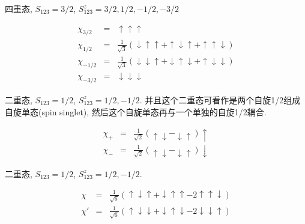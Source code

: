 四重态, $S_{123}=3/2$, $S_{123}^z = 3/2, 1/2, -1/2, -3/2$

\begin{eqnarray*}
\chi_{3/2} &=& \uparrow \uparrow \uparrow \\
\chi_{1/2} &=& \frac{1} {{\sqrt 3 }}\left( { \downarrow  \uparrow
\uparrow  +  \uparrow  \downarrow  \uparrow  +  \uparrow  \uparrow
\downarrow } \right) \\
\chi _{ - 1/2} &=& \frac{1} {{\sqrt 3 }}\left( { \downarrow
\downarrow  \uparrow  +  \downarrow  \uparrow  \downarrow  +
\uparrow  \downarrow  \downarrow } \right) \\
\chi _{ - 3/2} &=& \downarrow  \downarrow  \downarrow
\end{eqnarray*}



二重态, $S_{123}=1/2$, $S_{123}^z = 1/2, -1/2$.
并且这个二重态可看作是两个自旋1/2组成自旋单态(spin singlet),
然后这个自旋单态再与一个单独的自旋1/2耦合.


\begin{eqnarray*}
\chi_+ &=& \frac{1} {{\sqrt 2 }}\left( { \uparrow  \downarrow  -
\downarrow  \uparrow } \right) \uparrow \\
\chi_- &=& \frac{1} {{\sqrt 2 }}\left( { \uparrow  \downarrow  -
\downarrow  \uparrow } \right) \downarrow
\end{eqnarray*}



二重态, $S_{123}=1/2$, $S_{123}^z = 1/2, -1/2$.

\begin{eqnarray*}
\chi &=& \frac{1} {{\sqrt 6 }}\left( { \uparrow  \downarrow \uparrow
+ \downarrow  \uparrow  \uparrow  - 2 \uparrow  \uparrow \downarrow
} \right) \\
\chi' &=& \frac{1} {{\sqrt 6 }}\left( { \uparrow  \downarrow
\downarrow + \downarrow  \uparrow  \downarrow - 2 \downarrow
\downarrow  \uparrow } \right)
\end{eqnarray*}


